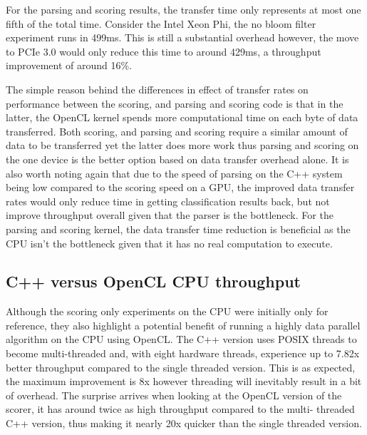 For the parsing and scoring results, the transfer time only represents at most
one fifth of the total time. Consider the Intel Xeon Phi, the no bloom filter
experiment runs in 499ms. This is still a substantial overhead however, the move
to PCIe 3.0 would only reduce this time to around 429ms, a throughput
improvement of around 16\%.

The simple reason behind the differences in effect of transfer rates on
performance between the scoring, and parsing and scoring code is that in the
latter, the OpenCL kernel spends more computational time on each byte of data
transferred. Both scoring, and parsing and scoring require a similar amount of
data to be transferred yet the latter does more work thus parsing and scoring on
the one device is the better option based on data transfer overhead alone. It is
also worth noting again that due to the speed of parsing on the C++ system being
low compared to the scoring speed on a GPU, the improved data transfer rates
would only reduce time in getting classification results back, but not improve
throughput overall given that the parser is the bottleneck. For the parsing and
scoring kernel, the data transfer time reduction is beneficial as the CPU isn't
the bottleneck given that it has no real computation to execute.

\subsection{C++ versus OpenCL CPU throughput}

Although the scoring only experiments on the CPU were initially only for
reference, they also highlight a potential benefit of running a highly data
parallel algorithm on the CPU using OpenCL. The C++ version uses POSIX threads
to become multi-threaded and, with eight hardware threads, experience up to
7.82x better throughput compared to the single threaded version. This is as
expected, the maximum improvement is 8x however threading will inevitably result
in a bit of overhead. The surprise arrives when looking at the OpenCL version of
the scorer, it has around twice as high throughput compared to the multi-
threaded C++ version, thus making it nearly 20x quicker than the single threaded
version.

